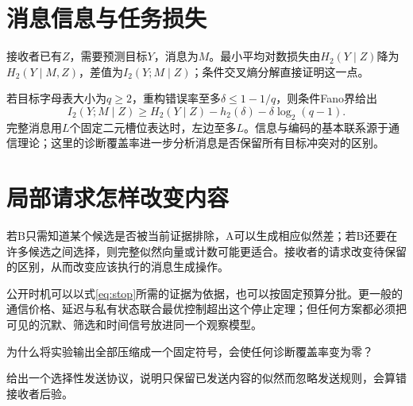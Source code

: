 \section{消息信息与任务损失}
接收者已有$Z$，需要预测目标$Y$，消息为$M$。最小平均对数损失由$H_2(Y\mid Z)$降为$H_2(Y\mid M,Z)$，差值为$I_2(Y;M\mid Z)$；条件交叉熵分解直接证明这一点。

若目标字母表大小为$q\ge2$，重构错误率至多$\delta\le1-1/q$，则条件Fano界给出
\[
 I_2(Y;M\mid Z)\ge H_2(Y\mid Z)-h_2(\delta)-\delta\log_2(q-1).
\]
完整消息用$L$个固定二元槽位表达时，左边至多$L$。信息与编码的基本联系源于通信理论\citep{shannon1948}；这里的诊断覆盖率进一步分析消息是否保留所有目标冲突对的区别。

\section{局部请求怎样改变内容}
若B只需知道某个候选是否被当前证据排除，A可以生成相应似然差；若B还要在许多候选之间选择，则完整似然向量或计数可能更适合。接收者的请求改变待保留的区别，从而改变应该执行的消息生成操作。

公开时机可以以式\eqref{eq:stop}所需的证据为依据，也可以按固定预算分批。更一般的通信价格、延迟与私有状态联合最优控制超出这个停止定理；但任何方案都必须把可见的沉默、筛选和时间信号放进同一个观察模型。

\begin{exercise}为什么将实验输出全部压缩成一个固定符号，会使任何诊断覆盖率变为零？\end{exercise}
\begin{exercise}给出一个选择性发送协议，说明只保留已发送内容的似然而忽略发送规则，会算错接收者后验。\end{exercise}
